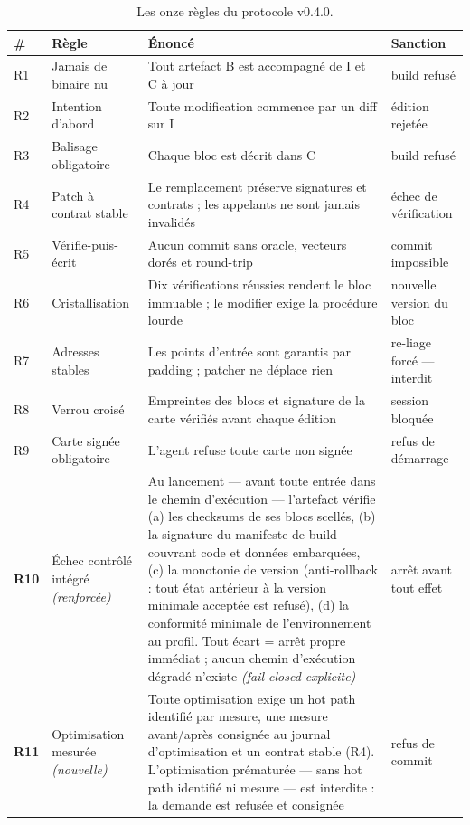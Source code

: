 \begin{table}[htbp]
\centering\small
\caption{Les onze règles du protocole v0.4.0.}
\label{tab:regles}
\begin{tabularx}{\textwidth}{@{}l l Y l@{}}
\toprule
\textbf{\#} & \textbf{Règle} & \textbf{Énoncé} & \textbf{Sanction} \\
\midrule
R1 & Jamais de binaire nu & Tout artefact B est accompagné de I et C à jour & build refusé \\
R2 & Intention d’abord & Toute modification commence par un diff sur I & édition rejetée \\
R3 & Balisage obligatoire & Chaque bloc est décrit dans C & build refusé \\
R4 & Patch à contrat stable & Le remplacement préserve signatures et contrats ; les
appelants ne sont jamais invalidés & échec de vérification \\
R5 & Vérifie-puis-écrit & Aucun commit sans oracle, vecteurs dorés et round-trip &
commit impossible \\
R6 & Cristallisation & Dix vérifications réussies rendent le bloc immuable ; le modifier
exige la procédure lourde & nouvelle version du bloc \\
R7 & Adresses stables & Les points d’entrée sont garantis par padding ; patcher ne
déplace rien & re-liage forcé — interdit \\
R8 & Verrou croisé & Empreintes des blocs et signature de la carte vérifiés avant chaque
édition & session bloquée \\
R9 & Carte signée obligatoire & L’agent refuse toute carte non signée & refus de
démarrage \\
\textbf{R10} & Échec contrôlé intégré \emph{(renforcée)} & Au lancement — avant toute
entrée dans le chemin d’exécution — l’artefact vérifie (a) les checksums de ses blocs
scellés, (b) la signature du manifeste de build couvrant code et données embarquées, (c)
la monotonie de version (anti-rollback : tout état antérieur à la version minimale
acceptée est refusé), (d) la conformité minimale de l’environnement au profil. Tout écart
= arrêt propre immédiat ; aucun chemin d’exécution dégradé n’existe \emph{(fail-closed
explicite)} & arrêt avant tout effet \\
\textbf{R11} & Optimisation mesurée \emph{(nouvelle)} & Toute optimisation exige un hot
path identifié par mesure, une mesure avant/après consignée au journal d’optimisation et
un contrat stable (R4). L’optimisation prématurée — sans hot path identifié ni mesure —
est interdite : la demande est refusée et consignée & refus de commit \\
\bottomrule
\end{tabularx}
\end{table}

